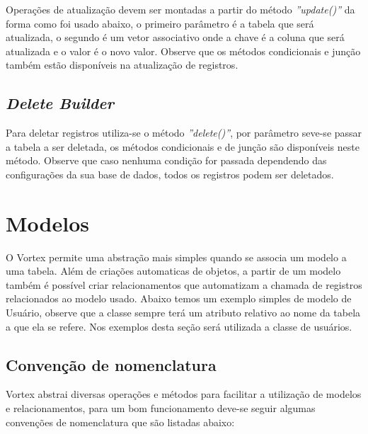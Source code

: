 Operações de atualização devem ser montadas a partir do método \textit{''update()''} da forma como foi usado abaixo, o primeiro parâmetro é a tabela que será atualizada, o segundo é um vetor associativo onde a chave é a coluna que será atualizada e o valor é o novo valor. Observe que os métodos condicionais e junção também estão disponíveis na atualização de registros.

\spaceH{}

\label{scripts/update_builder.php}

\subsection{\textit{Delete Builder}}

Para deletar registros utiliza-se o método \textit{''delete()''}, por parâmetro seve-se passar a tabela a ser deletada, os métodos condicionais e de junção são disponíveis neste método. Observe que caso nenhuma condição for passada dependendo das configurações da sua base de dados, todos os registros podem ser deletados.

\spaceH{}

\label{scripts/delete_builder.php}

\section{Modelos}\label{Modelos}

O Vortex permite uma abstração mais simples quando se associa um modelo a uma tabela. Além de criações automaticas de objetos, a partir de um modelo também é possível criar relacionamentos que automatizam a chamada de registros relacionados ao modelo usado. Abaixo temos um exemplo simples de modelo de Usuário, observe que a classe sempre terá um atributo relativo ao nome da tabela a que ela se refere. Nos exemplos desta seção será utilizada a classe de usuários.

\spaceH{}

\label{scripts/model_example.php}

\subsection{Convenção de nomenclatura}
Vortex abstrai diversas operações e métodos para facilitar a utilização de modelos e relacionamentos, para um bom funcionamento deve-se seguir algumas convenções de nomenclatura que são listadas abaixo:

